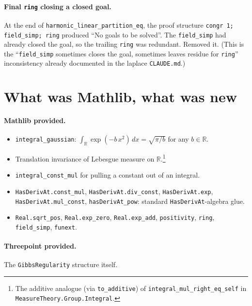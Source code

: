\documentclass[11pt]{article}
\begin{document}
\paragraph{Final \texttt{ring} closing a closed goal.} At the end of
\texttt{harmonic\_linear\_partition\_eq}, the proof structure
\texttt{congr 1; field\_simp; ring} produced ``No goals to be
solved''. The \texttt{field\_simp} had already closed the goal, so
the trailing \texttt{ring} was redundant. Removed it. (This is the
``\texttt{field\_simp} sometimes closes the goal, sometimes leaves
residue for \texttt{ring}'' inconsistency already documented in the
laplace \texttt{CLAUDE.md}.)

\section{What was Mathlib, what was new}

\paragraph{Mathlib provided.}
\begin{itemize}
\item \texttt{integral\_gaussian}: $\int_{\mathbb{R}} \exp(-b\,x^2)\,dx
= \sqrt{\pi / b}$ for any $b \in \mathbb{R}$.
\item Translation invariance of Lebesgue measure on
$\mathbb{R}$.\footnote{The additive analogue (via
\texttt{to\_additive}) of \texttt{integral\_mul\_right\_eq\_self} in
\texttt{MeasureTheory.Group.Integral}.}
\item \texttt{integral\_const\_mul} for pulling a constant out of an
integral.
\item \texttt{HasDerivAt.const\_mul}, \texttt{HasDerivAt.div\_const},
\texttt{HasDerivAt.exp}, \texttt{HasDerivAt.mul\_const},
\texttt{hasDerivAt\_pow}: standard \texttt{HasDerivAt}-algebra glue.
\item \texttt{Real.sqrt\_pos}, \texttt{Real.exp\_zero},
\texttt{Real.exp\_add}, \texttt{positivity}, \texttt{ring},
\texttt{field\_simp}, \texttt{funext}.
\end{itemize}

\paragraph{Threepoint provided.}
The \texttt{GibbsRegularity} structure itself.
\end{document}
